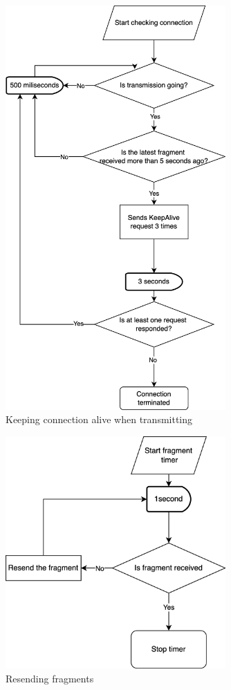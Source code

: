 \documentclass{article}
\begin{document}
\begin{figure}[!h]
    \centering
    \includegraphics[width=0.75\textwidth]{images/trkeepalive.png}
    \caption{Keeping connection alive when transmitting}
    \label{fig:mesh2}
\end{figure}

\begin{figure}[!h]
    \centering
    \includegraphics[width=0.75\textwidth]{images/resend.png}
    \caption{Resending fragments}
    \label{fig:mesh2}
\end{figure}
\end{document}
